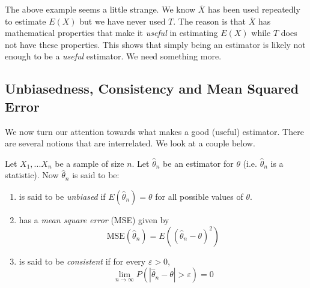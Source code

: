 The above example seems a little strange. We know $\overline{X}$ has been used repeatedly to estimate $E(X)$ but we have never used $T$. The reason is that $\overline{X}$ has mathematical properties that make it \textit{useful} in estimating $E(X)$ while $T$ does not have these properties. This shows that simply being an estimator is likely not enough to be a \textit{useful} estimator. We need something more.

\subsection{Unbiasedness, Consistency and Mean Squared Error}

We now turn our attention towards what makes a good (useful) estimator. There are several notions that are interrelated. We look at a couple below.

Let $X_1,...X_n$ be a sample of size $n$. Let $\hat{\theta}_n$ be an estimator for $\theta$ (i.e. $
\hat\theta_n$ is a statistic). Now $\hat\theta_n$ is said to be: 
\begin{enumerate}
    \item is said to be \textit{unbiased} if $E(\hat\theta_n) = \theta$ for all possible values of $\theta$.
    \item has a \textit{mean square error} (MSE) given by \[
\text{MSE}(\hat{\theta}_n) = E\left((\hat{\theta}_n - \theta)^2\right)
\]

    \item is said to be \textit{consistent} if for every $\varepsilon > 0$, 
    \[
    \lim_{n\rightarrow \infty} P(|\hat{\theta}_n - \theta|> \varepsilon) = 0
    \]

\end{enumerate}

